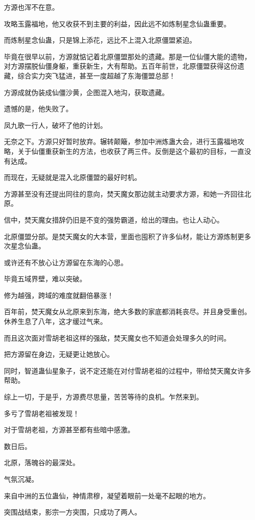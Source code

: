 \begin{this_body}
方源也浑不在意。

攻略玉露福地，他又收获不到主要的利益，因此远不如炼制星念仙蛊重要。

而炼制星念仙蛊，只是锦上添花，远比不上混入北原僵盟紧迫。

毕竟在很早以前，方源就惦记着北原僵盟那处的遗藏。那是一位仙僵大能的遗物，对方源摆脱仙僵身躯，重获新生，大有帮助。五百年前世，北原僵盟获得这份遗藏，综合实力突飞猛进，甚至一度超越了东海僵盟总部！

方源成就伪装成仙僵沙黄，企图混入地沟，获取遗藏。

遗憾的是，他失败了。

凤九歌一行人，破坏了他的计划。

无奈之下。方源只好暂时放弃。辗转颠簸，参加中洲炼蛊大会，进行玉露福地攻略，关于仙僵重获新生的方法，也收获了两三件。反倒是这个最初的目标，一直没有达成。

而现在，无疑就是混入北原僵盟的最好时机。

方源甚至没有还提出同往的意向，焚天魔女那边就主动要求方源，和她一齐回往北原。

信中，焚天魔女措辞仍旧是不变的强势霸道，给出的理由。也让人动心。

北原僵盟分部。是焚天魔女的大本营，里面也囤积了许多仙材，能让方源炼制更多次星念仙蛊。

或许还有不放心让方源留在东海的心思。

毕竟五域界壁，难以突破。

修为越强，跨域的难度就翻倍暴涨！

百年前，焚天魔女从北原来到东海，绝大多数的家底都消耗丧尽。并且身受重创。休养生息了八年，这才缓过气来。

而且这次面对雪胡老祖这样的强敌，焚天魔女也不知道会处理多久的时间。

把方源留在身边，无疑更让她放心。

同时，智道蛊仙星象子，说不定还能在对付雪胡老祖的过程中，带给焚天魔女许多帮助。

综上一切，于是乎，方源费尽思量，苦苦等待的良机。乍然来到。

多亏了雪胡老祖被发现！

对于雪胡老祖，方源甚至都有些暗中感激。

数日后。

北原，落魄谷的最深处。

气氛沉凝。

来自中洲的五位蛊仙，神情肃穆，凝望着眼前一处毫不起眼的地方。

突围战结束，影宗一方突围，只成功了两人。


\end{this_body}

